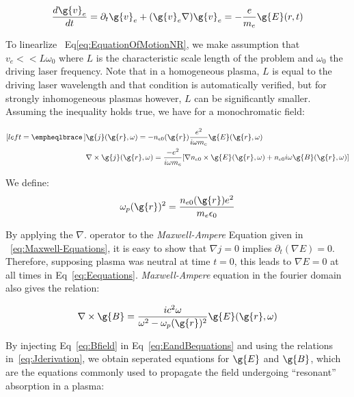 \begin{equation}
\frac{d\g{v}_e}{dt}=\partial_t\g{v}_e + (\g{v}_e\nabla )\g{v}_e = -\frac{e}{m_e}\g{E}(r,t) 
\label{eq:EquationOfMotionNR}
\end{equation}

\noindent To linearlize ~Eq\ref{eq:EquationOfMotionNR}, we make assumption that $v_e<<L \omega_0$ where $L$ is the characteristic scale length of the problem and $\omega_0$ the driving laser frequency. Note that in a homogeneous plasma, $L$ is equal to the driving laser wavelength and that condition is automatically verified, but for strongly inhomogeneous plasmas however, $L$ can be significantly smaller. Assuming the inequality holds true, we have for a monochromatic field:

\begin{subequations}
\label{eq:Jderivation}
\begin{align}[left = \empheqlbrace\,]
&\g{j}(\g{r},\omega) = - n_{e0}(\g{r})\frac{e^2}{i\omega m_e}\g{E}(\g{r},\omega)  \label{eq:PartialJ} \\
&\nabla \times \g{j}(\g{r},\omega) = \frac{-e^2}{i\omega m_e}[\nabla n_{e0} \times \g{E}(\g{r},\omega)+n_{e0} i\omega\g{ B}(\g{r},\omega) ]\label{eq:NablaJ} 
\end{align}
\end{subequations}

\noindent We define:
$$
\omega_p(\g{r})^2 = \frac{n_{e0}(\g{r})e^2}{m_e\epsilon_0}
$$


\noindent By applying the $\nabla.$ operator to the \textit{Maxwell-Ampere} Equation given in ~\ref{eq:Maxwell-Equations}, it is easy to show that $\nabla j =0$ implies $\partial_t (\nabla E) = 0$.
Therefore, supposing plasma was neutral at time $t=0$, this leads to $\nabla E = 0$ at all times in Eq~\ref{eq:Eequations}.
\textit{Maxwell-Ampere} equation in the fourier domain also gives the relation:

\begin{equation}
\label{eq:Bfield}
\nabla \times \g{B} = \frac{ic^2\omega}{\omega^2-\omega_p(\g{r})^2}\g{E}(\g{r},\omega)
\end{equation}

\noindent  By injecting Eq~\ref{eq:Bfield}  in Eq~\ref{eq:EandBequations} and using the relations in~\ref{eq:Jderivation}, we obtain seperated equations for $\g{E}$ and $\g{B}$, which are the equations commonly used to propagate the field undergoing ``resonant'' absorption in a plasma:



